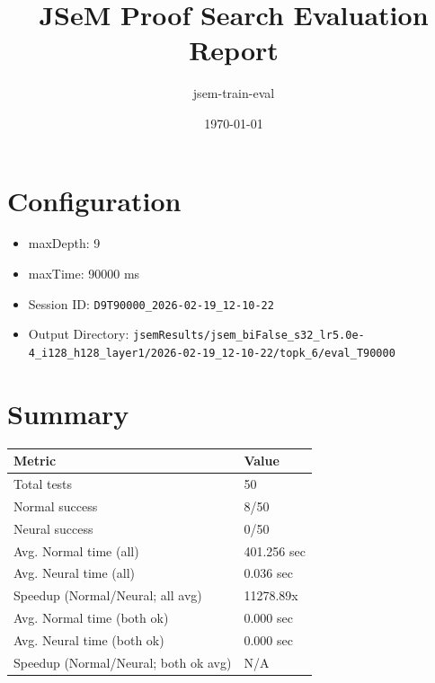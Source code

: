 \documentclass[a4paper,10pt]{article}
\title{JSeM Proof Search Evaluation Report}
\author{jsem-train-eval}
\date{\today}
\begin{document}
\maketitle

\section{Configuration}
\begin{itemize}
\item maxDepth: 9
\item maxTime: 90000 ms
\item Session ID: \texttt{D9T90000\_2026-02-19\_12-10-22}
\item Output Directory: \texttt{jsemResults/jsem\_biFalse\_s32\_lr5.0e-4\_i128\_h128\_layer1/2026-02-19\_12-10-22/topk\_6/eval\_T90000}
\end{itemize}

\section{Summary}
\begin{tabular}{ll}
\toprule
\textbf{Metric} & \textbf{Value} \\
\midrule
Total tests & 50 \\
Normal success & 8/50 \\
Neural success & 0/50 \\
\midrule
Avg. Normal time (all) & 401.256 sec \\
Avg. Neural time (all) & 0.036 sec \\
Speedup (Normal/Neural; all avg) & 11278.89x \\
Avg. Normal time (both ok) & 0.000 sec \\
Avg. Neural time (both ok) & 0.000 sec \\
Speedup (Normal/Neural; both ok avg) & N/A \\
\bottomrule
\end{tabular}
\end{document}
